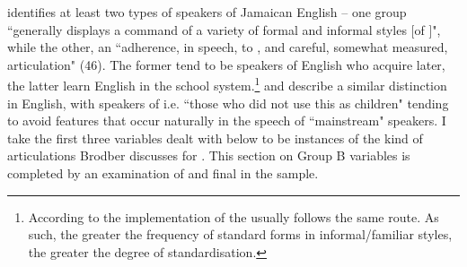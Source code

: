 \citet{Brodber1989} identifies at least two types of speakers of Jamaican English – one group ``generally displays a command of a variety of formal and informal styles [of ]", while the other, an ``adherence, in speech, to , and careful, somewhat measured, articulation" (46).  The former tend to be  speakers of English who acquire  later, the latter learn English in the school system.\footnote{According to \citet{Hernández-Campoy2003} the implementation of the  usually follows the same route.  As such, the greater the frequency of standard forms in informal\slash familiar styles, the greater the degree of standardisation.}  \citet[158]{Mugglestone1995} and \citet[229]{Wells1982a} describe a similar distinction in  English, with speakers of   i.e. ``those who did not use this  as children" tending to avoid features that occur naturally in the speech of ``mainstream" speakers.  I take the first three variables dealt with below to be instances of the kind of articulations Brodber discusses for  .  This section on Group B variables is completed by an examination of  and final  in the  sample.    

